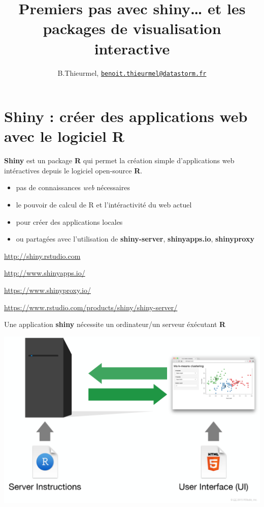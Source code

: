 \documentclass[]{article}
\title{Premiers pas avec shiny\ldots{} et les packages de visualisation
interactive}
\author{B.Thieurmel,
\href{mailto:benoit.thieurmel@datastorm.fr}{\nolinkurl{benoit.thieurmel@datastorm.fr}}}
\date{}
\providecommand{\tightlist}{%
  \setlength{\itemsep}{0pt}\setlength{\parskip}{0pt}}
\begin{document}
\maketitle

{
\setcounter{tocdepth}{2}
\tableofcontents
}
\section{Shiny : créer des applications web avec le logiciel
R}\label{shiny-creer-des-applications-web-avec-le-logiciel-r}

\textbf{Shiny} est un package \textbf{R} qui permet la création simple
d'applications web intéractives depuis le logiciel open-source
\textbf{R}.

\begin{itemize}
\tightlist
\item
  pas de connaissances \emph{web} nécessaires
\item
  le pouvoir de calcul de R et l'intéractivité du web actuel
\item
  pour créer des applications locales
\item
  ou partagées avec l'utilisation de \textbf{shiny-server},
  \textbf{shinyapps.io}, \textbf{shinyproxy}
\end{itemize}

\url{http://shiny.rstudio.com}

\url{http://www.shinyapps.io/}

\url{https://www.shinyproxy.io/}

\url{https://www.rstudio.com/products/shiny/shiny-server/}

Une application \textbf{shiny} nécessite un ordinateur/un serveur
éxécutant \textbf{R}

\includegraphics{img/server_R.png}
\end{document}

